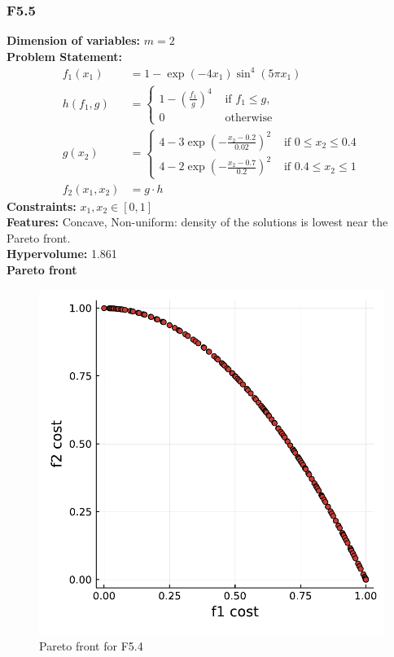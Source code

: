 \documentclass[11pt,oneside,onecolumn,openright]{article}
\begin{document}
   \subsubsection{F5.5~\cite{audet2008multiobjective}}
      \textbf{Dimension of variables: }$m=2$\\
  \noindent\textbf{Problem Statement: }
   \begin{equation}
   \begin{aligned}
  f_{1}\left(x_{1}\right) &=1-\exp \left(-4 x_{1}\right) \sin ^{4}\left(5 \pi x_{1}\right) \\
  h\left(f_{1}, g\right) &= \begin{cases}1-\left(\frac{f_{1}}{g}\right)^{4} & \text { if } f_{1} \leq g, \\
  0 & \text { otherwise }\end{cases} \\
  g\left(x_{2}\right)&= \begin{cases}4-3 \exp \left(-\frac{x_{2}-0.2}{0.02}\right)^{2} & \text { if } 0 \leq x_{2} \leq 0.4 \\
  4-2 \exp \left(-\frac{x_{2}-0.7}{0.2}\right)^{2} & \text { if } 0.4 \leq x_{2} \leq 1\end{cases}\\
  f_2(x_{1}, x_{2})&=g\cdot h
  \end{aligned}
  \end{equation}
  \noindent\textbf{Constraints: } $x_{1}, x_{2} \in[0,1]$\\
  \noindent\textbf{Features: } Concave, Non-uniform: density of the solutions is lowest near the Pareto front.\\
  \noindent\textbf{Hypervolume: } 1.861\\
  \noindent\textbf{Pareto front}
      \begin{figure}[H]
      \centering
      \includegraphics[width=12cm]{fig/bias.pdf}
      \cprotect\caption{Pareto front for F5.4}
      \end{figure}
\end{document}
